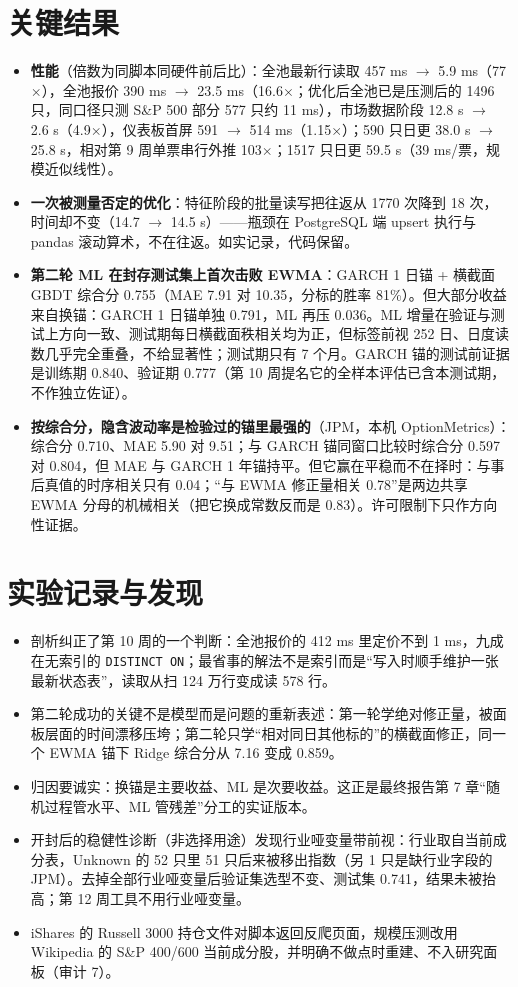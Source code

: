 \documentclass[11pt]{ctexart}
\begin{document}
\section{关键结果}
\begin{itemize}
  \item \textbf{性能}（倍数为同脚本同硬件前后比）：全池最新行读取 457 ms $\to$ 5.9 ms（77$\times$），全池报价 390 ms $\to$ 23.5 ms（16.6$\times$；优化后全池已是压测后的 1496 只，同口径只测 S\&P 500 部分 577 只约 11 ms），市场数据阶段 12.8 s $\to$ 2.6 s（4.9$\times$），仪表板首屏 591 $\to$ 514 ms（1.15$\times$）；590 只日更 38.0 s $\to$ 25.8 s，相对第 9 周单票串行外推 103$\times$；1517 只日更 59.5 s（39 ms/票，规模近似线性）。
  \item \textbf{一次被测量否定的优化}：特征阶段的批量读写把往返从 1770 次降到 18 次，时间却不变（14.7 $\to$ 14.5 s）——瓶颈在 PostgreSQL 端 upsert 执行与 pandas 滚动算术，不在往返。如实记录，代码保留。
  \item \textbf{第二轮 ML 在封存测试集上首次击败 EWMA}：GARCH 1 日锚 + 横截面 GBDT 综合分 0.755（MAE 7.91 对 10.35，分标的胜率 81\%）。但大部分收益来自换锚：GARCH 1 日锚单独 0.791，ML 再压 0.036。ML 增量在验证与测试上方向一致、测试期每日横截面秩相关均为正，但标签前视 252 日、日度读数几乎完全重叠，不给显著性；测试期只有 7 个月。GARCH 锚的测试前证据是训练期 0.840、验证期 0.777（第 10 周提名它的全样本评估已含本测试期，不作独立佐证）。
  \item \textbf{按综合分，隐含波动率是检验过的锚里最强的}（JPM，本机 OptionMetrics）：综合分 0.710、MAE 5.90 对 9.51；与 GARCH 锚同窗口比较时综合分 0.597 对 0.804，但 MAE 与 GARCH 1 年锚持平。但它赢在平稳而不在择时：与事后真值的时序相关只有 0.04；“与 EWMA 修正量相关 0.78”是两边共享 EWMA 分母的机械相关（把它换成常数反而是 0.83）。许可限制下只作方向性证据。
\end{itemize}

\section{实验记录与发现}
\begin{itemize}
  \item 剖析纠正了第 10 周的一个判断：全池报价的 412 ms 里定价不到 1 ms，九成在无索引的 \texttt{DISTINCT ON}；最省事的解法不是索引而是“写入时顺手维护一张最新状态表”，读取从扫 124 万行变成读 578 行。
  \item 第二轮成功的关键不是模型而是问题的重新表述：第一轮学绝对修正量，被面板层面的时间漂移压垮；第二轮只学“相对同日其他标的”的横截面修正，同一个 EWMA 锚下 Ridge 综合分从 7.16 变成 0.859。
  \item 归因要诚实：换锚是主要收益、ML 是次要收益。这正是最终报告第 7 章“随机过程管水平、ML 管残差”分工的实证版本。
  \item 开封后的稳健性诊断（非选择用途）发现行业哑变量带前视：行业取自当前成分表，Unknown 的 52 只里 51 只后来被移出指数（另 1 只是缺行业字段的 JPM）。去掉全部行业哑变量后验证集选型不变、测试集 0.741，结果未被抬高；第 12 周工具不用行业哑变量。
  \item iShares 的 Russell 3000 持仓文件对脚本返回反爬页面，规模压测改用 Wikipedia 的 S\&P 400/600 当前成分股，并明确不做点时重建、不入研究面板（审计 7）。
\end{itemize}
\end{document}
